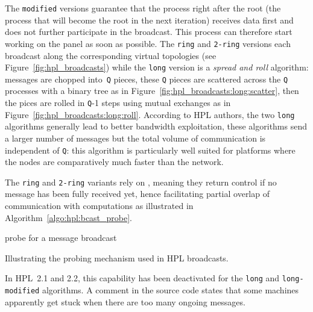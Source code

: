 \begin{itemize}
                The \texttt{modified} versions guarantee that the process right after the root (\ie the process that
                will become the root in the next iteration) receives data first and does not further participate in the
                broadcast. This process can therefore start working on the panel as soon as possible. The \texttt{ring}
                and \texttt{2-ring} versions each broadcast along the corresponding virtual topologies (see
                Figure~\ref{fig:hpl_broadcasts}) while the
                \texttt{long} version is a \emph{spread and roll} algorithm: messages are chopped into \texttt{Q}
                pieces, these \texttt{Q} pieces are scattered across the \texttt{Q} processes with a binary tree as in
                Figure~\ref{fig:hpl_broadcasts:long:scatter}, then the pices are rolled in \texttt{Q}-1 steps using
                mutual exchanges as in Figure~\ref{fig:hpl_broadcasts:long:roll}. According to HPL authors, the two
                \texttt{long} algorithms generally lead to better bandwidth exploitation, these algorithms send a larger
                number of messages but the total volume of communication is independent of \texttt{Q}: this algorithm is
                particularly well suited for platforms where the nodes are comparatively much faster than the network.

                The \texttt{ring} and \texttt{2-ring} variants rely on \iprobe, meaning they return control
                if no message has been fully received yet, hence facilitating partial overlap of communication with
                computations as illustrated in Algorithm~\ref{algo:hpl:bcast_probe}.

                \begin{minipage}{\linewidth}\begin{algorithm}[H]
                    \DontPrintSemicolon
                    probe for a message\;
                    broadcast\;
                    \caption{Illustrating the probing mechanism used in HPL broadcasts.}
                    \label{algo:hpl:bcast_probe}
                \end{algorithm}\end{minipage}

                In HPL 2.1 and 2.2, this capability has been deactivated for the \texttt{long} and
                \texttt{long-modified} algorithms. A comment in the source code states that some machines apparently get
                stuck when there are too many ongoing messages.
        \end{itemize}

